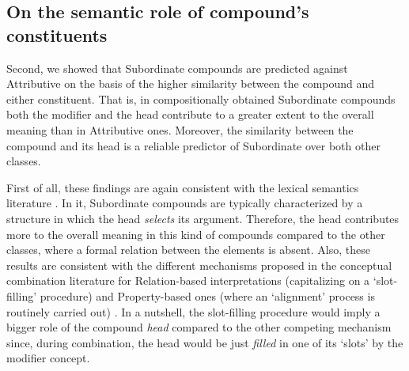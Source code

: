 \documentclass[output=paper]{langsci/langscibook}
\begin{document}
\subsection{On the semantic role of compound's constituents}

Second, we showed that Subordinate compounds are predicted against Attributive on the basis of the higher similarity between the compound and either constituent. That is, in compositionally obtained Subordinate compounds both the modifier and the head contribute to a greater extent to the overall meaning than in Attributive ones. Moreover, the similarity between the compound and its head is a reliable predictor of Subordinate over both other classes.

First of all, these findings are again consistent with the lexical semantics literature \citep{sbg2005,lieber5OHC}. In it, Subordinate compounds are typically characterized by a structure in which the head \emph{selects} its argument. Therefore, the head contributes more to the overall meaning in this kind of compounds compared to the other classes, where a formal relation between the elements is absent. Also, these results are consistent with the different mechanisms proposed in the conceptual combination literature for Relation-based interpretations (capitalizing on a `slot-filling' procedure) and Property-based ones (where an `alignment' process is routinely carried out) \citep{wisniewskigentner,wisniewski1996}. In a nutshell, the slot-filling procedure would imply a bigger role of the compound \emph{head} compared to the other competing mechanism since, during combination, the head would be just \emph{filled} in one of its `slots' by the modifier concept.
\end{document}
